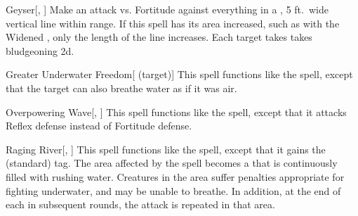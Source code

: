 \lowercase{\hypertarget{spell:Geyser}{}}\label{spell:Geyser}
\begin{apability}[\nth{2}]{\hypertarget{spell:Geyser}{Geyser}}[, ]
Make an attack vs. Fortitude against everything in a \arealarge, 5 ft.\ wide vertical line within \rngmed range.
If this spell has its area increased, such as with the Widened , only the length of the line increases.
\hit Each target takes takes bludgeoning  \plus2d.
\end{apability}
\vspace{0.25em}



\lowercase{\hypertarget{spell:Greater Underwater Freedom}{}}\label{spell:Greater Underwater Freedom}
\begin{attuneability}[\nth{3}]{\hypertarget{spell:Greater Underwater Freedom}{Greater Underwater Freedom}}[ (target)]
This spell functions like the  spell, except that the target can also breathe water as if it was air.
\end{attuneability}
\vspace{0.25em}



\lowercase{\hypertarget{spell:Overpowering Wave}{}}\label{spell:Overpowering Wave}
\begin{apability}[\nth{3}]{\hypertarget{spell:Overpowering Wave}{Overpowering Wave}}[, ]
This spell functions like the  spell, except that it attacks Reflex defense instead of Fortitude defense.
\end{apability}
\vspace{0.25em}



\lowercase{\hypertarget{spell:Raging River}{}}\label{spell:Raging River}
\begin{apability}[\nth{3}]{\hypertarget{spell:Raging River}{Raging River}}[, ]
This spell functions like the  spell, except that it gains the  (standard) tag.
The area affected by the spell becomes a  that is continuously filled with rushing water.
Creatures in the area suffer penalties appropriate for fighting underwater, and may be unable to breathe.
In addition, at the end of each  in subsequent rounds, the attack is repeated in that area.
\end{apability}
\vspace{0.25em}



